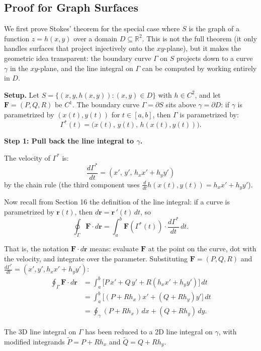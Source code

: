\documentclass[11pt]{report}
\newcommand{\R}{\mathbb{R}}
\begin{document}
\subsection{Proof for Graph Surfaces}

We first prove Stokes' theorem for the special case where $S$ is the graph of a function $z = h(x,y)$ over a domain $D \subseteq \R^2$. This is not the full theorem (it only handles surfaces that project injectively onto the $xy$-plane), but it makes the geometric idea transparent: the boundary curve $\Gamma$ on $S$ projects down to a curve $\gamma$ in the $xy$-plane, and the line integral on $\Gamma$ can be computed by working entirely in $D$.

\textbf{Setup.} Let $S = \{(x, y, h(x,y)) : (x,y) \in D\}$ with $h \in C^2$, and let $\mathbf{F} = (P, Q, R)$ be $C^1$. The boundary curve $\Gamma = \partial S$ sits above $\gamma = \partial D$: if $\gamma$ is parametrized by $(x(t), y(t))$ for $t \in [a, b]$, then $\Gamma$ is parametrized by:
\[
\Gamma^*(t) = \big(x(t), \, y(t), \, h(x(t), y(t))\big).
\]

\textbf{Step 1: Pull back the line integral to $\gamma$.}

The velocity of $\Gamma^*$ is:
\[
\frac{d\Gamma^*}{dt} = (x', \, y', \, h_x x' + h_y y')
\]
by the chain rule (the third component uses $\frac{d}{dt}h(x(t), y(t)) = h_x x' + h_y y'$).

Now recall from Section 16 the definition of the line integral: if a curve is parametrized by $\mathbf{r}(t)$, then $d\mathbf{r} = \mathbf{r}\,'(t) \, dt$, so
\[
\oint_\Gamma \mathbf{F} \cdot d\mathbf{r} = \int_a^b \mathbf{F}(\Gamma^*(t)) \cdot \frac{d\Gamma^*}{dt} \, dt.
\]

That is, the notation $\mathbf{F} \cdot d\mathbf{r}$ means: evaluate $\mathbf{F}$ at the point on the curve, dot with the velocity, and integrate over the parameter. Substituting $\mathbf{F} = (P, Q, R)$ and $\frac{d\Gamma^*}{dt} = (x', y', h_x x' + h_y y')$:
\begin{align*}
\oint_\Gamma \mathbf{F} \cdot d\mathbf{r} &= \int_a^b \big[ P \, x' + Q \, y' + R(h_x x' + h_y y') \big] \, dt \\
&= \int_a^b \big[ (P + Rh_x) x' + (Q + Rh_y) y' \big] \, dt \\
&= \oint_\gamma (P + Rh_x) \, dx + (Q + Rh_y) \, dy.
\end{align*}

The 3D line integral on $\Gamma$ has been reduced to a 2D line integral on $\gamma$, with modified integrands $\tilde{P} = P + Rh_x$ and $\tilde{Q} = Q + Rh_y$.
\end{document}
